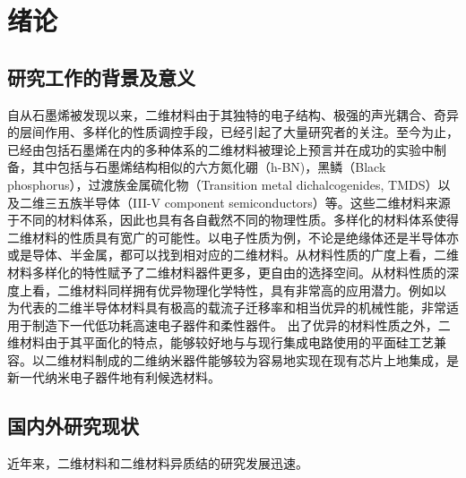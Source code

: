 \chapter{绪\hspace{6pt}论}

\section{研究工作的背景及意义}
自从石墨烯被发现以来，二维材料由于其独特的电子结构、极强的声光耦合、奇异的层间作用、多样化的性质调控手段，已经引起了大量研究者的关注。至今为止，已经由包括石墨烯在内的多种体系的二维材料被理论上预言并在成功的实验中制备，其中包括与石墨烯结构相似的六方氮化硼（h-BN)，黑鳞（Black phosphorus），过渡族金属硫化物（Transition metal dichalcogenides, TMDS）以及二维三五族半导体（III-V component semiconductors）等。这些二维材料来源于不同的材料体系，因此也具有各自截然不同的物理性质。多样化的材料体系使得二维材料的性质具有宽广的可能性。以电子性质为例，不论是绝缘体还是半导体亦或是导体、半金属，都可以找到相对应的二维材料。从材料性质的广度上看，二维材料多样化的特性赋予了二维材料器件更多，更自由的选择空间。从材料性质的深度上看，二维材料同样拥有优异物理化学特性，具有非常高的应用潜力。例如以
为代表的二维半导体材料具有极高的载流子迁移率和相当优异的机械性能，非常适用于制造下一代低功耗高速电子器件和柔性器件。
出了优异的材料性质之外，二维材料由于其平面化的特点，能够较好地与与现行集成电路使用的平面硅工艺兼容。以二维材料制成的二维纳米器件能够较为容易地实现在现有芯片上地集成，是新一代纳米电子器件地有利候选材料。


\section{国内外研究现状}
近年来，二维材料和二维材料异质结的研究发展迅速。